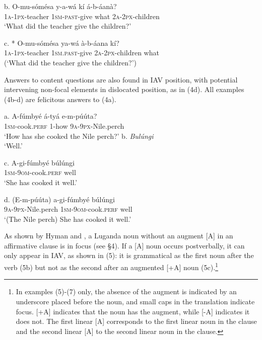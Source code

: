 \documentclass[output=paper]{langsci/langscibook}
\begin{document}
\ea
\gll b.  O-mu-sómésa  y-a-wá    kí  á-b-áanà?\\
       \textsc{1a-1px}{}-teacher  \textsc{1sm-past}{}-give  what  \textsc{2a-2px}{}-children\\
\glt   ‘What did the teacher give the children?’
\z

\ea
\gll c.  * O-mu-sómésa  ya-wá      à-b-áana    kí?\\
       \textsc{1a-1px}{}-teacher  \textsc{1sm.past-}give  \textsc{2a-2px}{}-children  what\\
\glt   (‘What did the teacher give the children?’)
\z

Answers to content questions are also found in IAV position, with potential intervening non-focal elements in dislocated position, as in (4d). All examples (4b-d) are felicitous answers to (4a).

\ea
\gll a.  A-fúmbyé    á-tyá    e-m-púúta?\\
     \textsc{  1sm}{}-cook.\textsc{perf}  1-how    \textsc{9a}{}-\textsc{9px}{}-Nile.perch\\
\glt ‘How has she cooked the Nile perch?’
\z
\ea
 b.  \textit{Bulúngi}\\
\glt  ‘Well.’
\z

\ea
\gll c.  A-gi-fúmbyé      búlúngi\\
       \textsc{1sm}{}-\textsc{9om}{}-cook.\textsc{perf}  well\\
\glt   ‘She has cooked it well.’
\z

\ea
\gll d.  (E-m-púúta)    a-gi-fúmbyé      búlúngi\\
       \textsc{9a}{}-\textsc{9px}{}-Nile.perch  \textsc{1sm}{}-\textsc{9om}{}-cook.\textsc{perf}  well\\
\glt   ‘(The Nile perch) She has cooked it well.’
\z

As shown by Hyman and \citet{Katamba1993}, a Luganda noun without an augment [A] in an affirmative clause is in focus (see §4). If a [A] noun occurs postverbally, it can only appear in IAV, as shown in (5): it is grammatical as the first noun after the verb (5b) but not as the second after an augmented [+A] noun (5c).\footnote{ In examples (5)-(7) only, the absence of the augment is indicated by an underscore placed before the noun, and small caps in the translation indicate focus. [+A] indicates that the noun has the augment, while [-A] indicates it does not.  The first linear [A] corresponds to the first linear noun in the clause and the second linear [A] to the second linear noun in the clause. }
\end{document}
